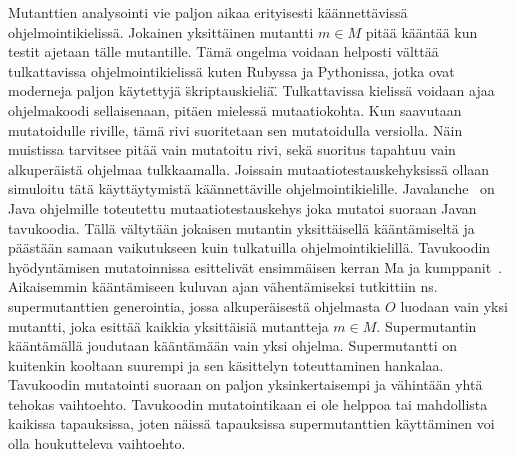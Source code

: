 \documentclass{tktltiki}
\begin{document}
Mutanttien analysointi vie paljon aikaa erityisesti käännettävissä ohjelmointikielissä. Jokainen yksittäinen mutantti $m\in M$ pitää kääntää kun testit ajetaan tälle mutantille. Tämä ongelma voidaan helposti välttää tulkattavissa ohjelmointikielissä kuten Rubyssa ja Pythonissa, jotka ovat moderneja paljon käytettyjä \"skriptauskieliä\". Tulkattavissa kielissä voidaan ajaa ohjelmakoodi sellaisenaan, pitäen mielessä mutaatiokohta. Kun saavutaan mutatoidulle riville, tämä rivi suoritetaan sen mutatoidulla versiolla. Näin muistissa tarvitsee pitää vain mutatoitu rivi, sekä suoritus tapahtuu vain alkuperäistä ohjelmaa tulkkaamalla. Joissain mutaatiotestauskehyksissä ollaan simuloitu tätä käyttäytymistä käännettäville ohjelmointikielille. Javalanche~\cite{SchulerZ09} on Java ohjelmille toteutettu mutaatiotestauskehys joka mutatoi suoraan Javan tavukoodia. Tällä vältytään jokaisen mutantin yksittäisellä kääntämiseltä ja päästään samaan vaikutukseen kuin tulkatuilla ohjelmointikielillä. Tavukoodin hyödyntämisen mutatoinnissa esittelivät ensimmäisen kerran Ma ja kumppanit~\cite{MaOK05}. Aikaisemmin kääntämiseen kuluvan ajan vähentämiseksi tutkittiin ns. supermutanttien generointia, jossa alkuperäisestä ohjelmasta $O$ luodaan vain yksi mutantti, joka esittää kaikkia yksittäisiä mutantteja $m\in M$. Supermutantin kääntämällä joudutaan kääntämään vain yksi ohjelma. Supermutantti on kuitenkin kooltaan suurempi ja sen käsittelyn toteuttaminen hankalaa. Tavukoodin mutatointi suoraan on paljon yksinkertaisempi ja vähintään yhtä tehokas vaihtoehto. Tavukoodin mutatointikaan ei ole helppoa tai mahdollista kaikissa tapauksissa, joten näissä tapauksissa supermutanttien käyttäminen voi olla houkutteleva vaihtoehto.
\end{document}
